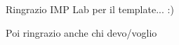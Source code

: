 \vspace*{10pc}
\thispagestyle{empty}
\begin{flushright}
\sl

Ringrazio IMP Lab per il template... :)

Poi ringrazio anche chi devo/voglio

\end{flushright}
\par\vfill\par
